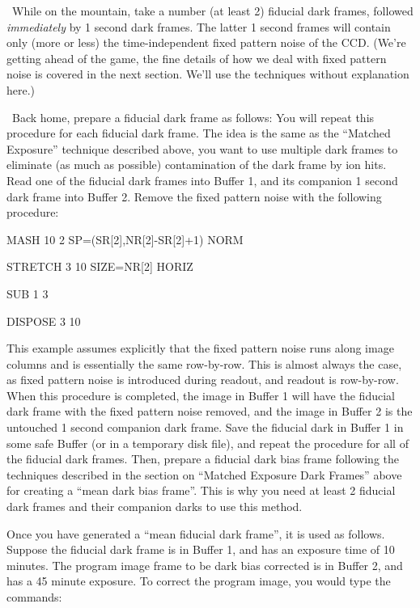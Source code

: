 \ While on the mountain, take a number (at least 2)
fiducial dark frames, followed {\it immediately} by 1 second dark frames.  The
latter 1 second frames will contain only (more or less) the time-independent
fixed pattern noise of the CCD.  (We're getting ahead of the game, the fine
details of how we deal with fixed pattern noise is covered in the next
section.  We'll use the techniques without explanation here.) 

\ Back home, prepare a fiducial dark frame as follows:
You will repeat this procedure for each fiducial dark frame.  The idea is the
same as the ``Matched Exposure'' technique described above, you want to use
multiple dark frames to eliminate (as much as possible) contamination of the
dark frame by ion hits. Read one of the fiducial dark frames into Buffer 1,
and its companion 1 second dark frame into Buffer 2.  Remove the fixed pattern
noise with the following procedure:

\begin{command}
      \item MASH 10 2 SP=(SR[2],NR[2]-SR[2]+1) NORM
      \item STRETCH 3 10 SIZE=NR[2] HORIZ
      \item SUB 1 3
      \item DISPOSE 3 10
\end{command}

This example assumes explicitly that the fixed pattern noise runs along image
columns and is essentially the same row-by-row.  This is almost always the
case, as fixed pattern noise is introduced during readout, and readout is
row-by-row.  When this procedure is completed, the image in Buffer 1 will have
the fiducial dark frame with the fixed pattern noise removed, and the image in
Buffer 2 is the untouched 1 second companion dark frame.  Save the fiducial
dark in Buffer 1 in some safe Buffer (or in a temporary disk file), and repeat
the procedure for all of the fiducial dark frames.  Then, prepare a fiducial
dark bias frame following the techniques described in the section on ``Matched
Exposure Dark Frames'' above for creating a ``mean dark bias frame''. This is
why you need at least 2 fiducial dark frames and their companion darks to use
this method. 

Once you have generated a ``mean fiducial dark frame'', it is used as
follows.  Suppose the fiducial dark frame is in Buffer 1, and has
an exposure time of 10 minutes.  The program image frame to be dark
bias corrected is in Buffer 2, and has a 45 minute exposure.  To correct
the program image, you would type the commands:

